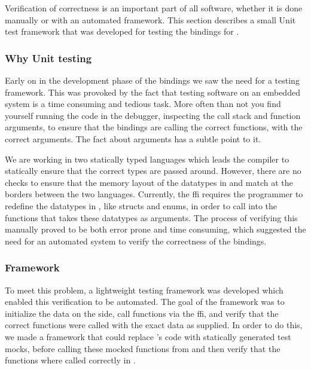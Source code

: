 Verification of correctness is an important part of all software, whether it is done manually or with an automated framework.
This section describes a small Unit test framework that was developed for testing the bindings for {\emlib}.

\subsubsection{Why Unit testing}

Early on in the development phase of the {\emlib} bindings we saw the need for a testing framework.
This was provoked by the fact that testing software on an embedded system is a time consuming and tedious task.
More often than not you find yourself running the code in the debugger, inspecting the call stack and function arguments, to ensure that the bindings are calling the correct functions, with the correct arguments.
The fact about arguments has a subtle point to it.

We are working in two statically typed languages which leads the compiler to statically ensure that the correct types are passed around.
However, there are no checks to ensure that the memory layout of the datatypes in {\C} and {\rust} match at the borders between the two languages.
Currently, the {\rust} \gls{ffi} requires the programmer to redefine the {\C} datatypes in {\rust}, like structs and enums, in order to call into the {\C} functions that takes these datatypes as arguments.
The process of verifying this manually proved to be both error prone and time consuming, which suggested the need for an automated system to verify the correctness of the bindings.

\subsubsection{Framework}

To meet this problem, a lightweight testing framework was developed which enabled this verification to be automated.
The goal of the framework was to initialize the data on the {\rust} side, call functions via the \gls{ffi}, and verify that the correct functions were called with the exact data as supplied.
In order to do this, we made a framework that could replace {\emlib}'s code with statically generated test mocks, before calling these mocked functions from {\rust} and then verify that the functions where called correctly in {\C}.

